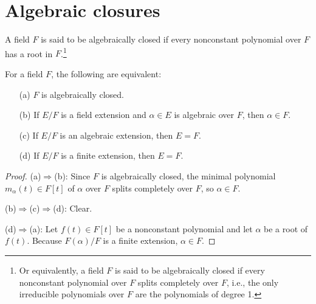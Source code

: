 \section{Algebraic closures}

\begin{defi}
    A field $F$ is said to be algebraically closed if every nonconstant polynomial over $F$ has a root in $F$.\footnote{Or equivalently, a field $F$ is said to be algebraically closed if every nonconstant polynomial over $F$ splits completely over $F$, i.e., the only irreducible polynomials over $F$ are the polynomials of degree 1.}
\end{defi}
\begin{obs}\label{obs: alg. cl.}
    For a field $F$, the following are equivalent:
    \begin{enumerate}
        \item[(a)]
        {
            $F$ is algebraically closed.
        }
        \item[(b)]
        {
            If $E/F$ is a field extension and $\alpha\in E$ is algebraic over $F$, then $\alpha\in F$.
        }
        \item[(c)]
        {
            If $E/F$ is an algebraic extension, then $E=F$.
        }
        \item[(d)]
        {
            If $E/F$ is a finite extension, then $E=F$.
        }
    \end{enumerate}
\end{obs}
\begin{proof}
    \hangindent=0.65cm
    \noindent(a)$\Rightarrow$(b):
    Since $F$ is algebraically closed, the minimal polynomial $m_\alpha(t)\in F[t]$ of $\alpha$ over $F$ splits completely over $F$, so $\alpha\in F$.

    \noindent(b)$\Rightarrow$(c)$\Rightarrow$(d):
    Clear.

    \noindent(d)$\Rightarrow$(a):
    Let $f(t)\in F[t]$ be a nonconstant polynomial and let $\alpha$ be a root of $f(t)$.
    Because $F(\alpha)/F$ is a finite extension, $\alpha\in F$.
\end{proof}

